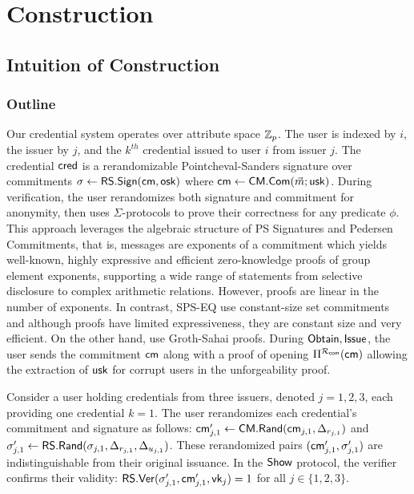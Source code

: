 \newpage
\section{Construction}


\subsection{Intuition of Construction}

\subsubsection{Outline}
Our credential system operates over attribute space $\mathbb{Z}_p$. The user is indexed by $i$, the issuer by $j$, and the $k^{th}$ credential issued to user $i$ from issuer $j$. The credential $\mathsf{cred}$ is a rerandomizable Pointcheval-Sanders signature over commitments $\sigma \gets \mathsf{RS.Sign}(\mathsf{cm}, \mathsf{osk})$ where $\mathsf{cm} \gets \mathsf{CM.Com}(\vec{m}; \mathsf{usk})$. During verification, the user rerandomizes both signature and commitment for anonymity, then uses $\Sigma$-protocols to prove their correctness for any predicate $\phi$. This approach leverages the algebraic structure of PS Signatures and Pedersen Commitments, that is, messages are exponents of a commitment which yields well-known, highly expressive and efficient zero-knowledge proofs of group element exponents, supporting a wide range of statements from selective disclosure to complex arithmetic relations. However, proofs are linear in the number of exponents. In contrast, SPS-EQ \cite{fuchsbauer_structure-preserving_2019, hanaoka_improved_2022} use constant-size set commitments and although proofs have limited expressiveness, they are constant size and very efficient. On the other hand, \cite{rabaninejad_attribute-based_2024} use Groth-Sahai proofs. During $\mathsf{Obtain}, \mathsf{Issue}$, the user sends the commitment $\mathsf{cm}$ along with a proof of opening $\Pi^{\mathcal{R}_{\mathsf{com}}}(\mathsf{cm})$ allowing the extraction of $\mathsf{usk}$ for corrupt users in the unforgeability proof.

Consider a user holding credentials from three issuers, denoted $j = 1, 2, 3$, each providing one credential $k = 1$. The user rerandomizes each credential’s commitment and signature as follows: $\mathsf{cm}_{j,1}' \gets \mathsf{CM.Rand}(\mathsf{cm}_{j,1}, \Delta_{r_{j,1}})$ and $\sigma_{j,1}' \gets \mathsf{RS.Rand}(\sigma_{j,1}, \Delta_{r_{j,1}}, \Delta_{u_{j,1}})$. These rerandomized pairs $(\mathsf{cm}_{j,1}', \sigma_{j,1}')$ are indistinguishable from their original issuance. In the $\mathsf{Show}$ protocol, the verifier confirms their validity: $\mathsf{RS.Ver}(\sigma_{j,1}', \mathsf{cm}_{j,1}', \mathsf{vk}_j) = 1$ for all $j \in \{1, 2, 3\}$.

